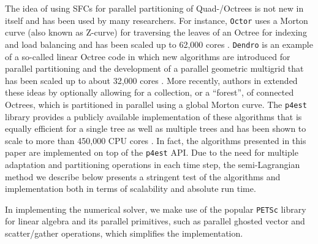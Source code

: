 The idea of using SFCs for parallel partitioning of Quad-/Octrees is not new in itself and has been used by many researchers. For instance, \texttt{Octor} \cite{Tu;OHallaron;Ghattas:05:Scalable-parallel-oc} uses a Morton curve (also known as Z-curve) for traversing the leaves of an Octree for indexing and load balancing and has been scaled up to 62,000 cores \cite{Burstedde;Ghattas;Gurnis;etal:08:Scalable-adaptive-ma}.
\texttt{Dendro} \cite{Sampath;Adavani;Sundar;etal:08:Dendro:-parallel-alg} is
an example of a so-called linear Octree code in which new algorithms are
introduced for parallel partitioning and the development of a parallel
geometric multigrid that has been scaled up to about 32,000 cores
\cite{Sampath;Biros:10:A-parallel-geometric}.
More recently, authors in
\cite{Burstedde;Wilcox;Ghattas:11:p4est:-Scalable-Algo} extended these ideas by
optionally allowing for a collection, or a ``forest'', of connected Octrees,
which is partitioned in parallel using a global Morton curve.
%
%
%
The \texttt{p4est} library \cite{p4est-github} provides a publicly available
implementation of these algorithms that is equally efficient for a single tree
as well as multiple trees and has been shown to scale to more than
450,000 CPU cores \cite{IsaacBursteddeWilcoxEtAl15}.
In fact, the algorithms presented in this paper are implemented on top of
the \texttt{p4est} API.
Due to the need for multiple adaptation and partitioning operations in each
time step, the semi-Lagrangian method we describe below presents a stringent
test of the algorithms and implementation both in terms of scalability and
absolute run time.
%

In implementing the numerical solver, we make use of the popular \texttt{PETSc}
\cite{Balay;Abhyankar;Adams;etal:14:PETSc-Web-page} library for linear algebra
and its parallel primitives, such as parallel ghosted vector and scatter/gather
operations, which simplifies the implementation.


